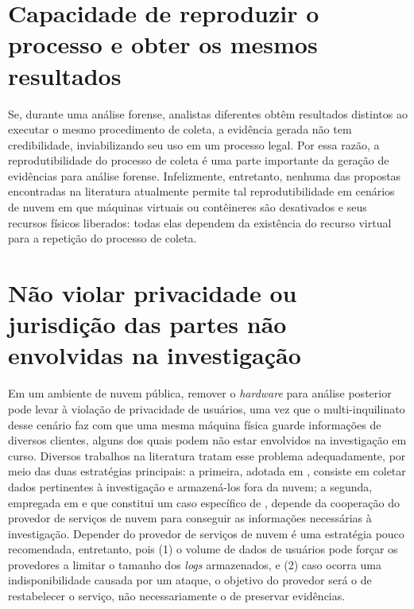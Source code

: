 \section{Capacidade de reproduzir o processo e obter os mesmos resultados}
\label{sec:reprodutibilidade}

Se, durante uma análise forense, analistas diferentes obtêm resultados distintos ao executar o mesmo procedimento de coleta, a evidência gerada não tem credibilidade, inviabilizando seu uso em um processo legal. 
%
Por essa razão, a reprodutibilidade do processo de coleta é uma parte importante da geração de evidências para análise forense.
%
Infelizmente, entretanto, nenhuma das propostas encontradas na literatura atualmente permite tal reprodutibilidade em cenários de nuvem em que máquinas virtuais ou contêineres são desativados e seus recursos físicos liberados: todas elas dependem da existência do recurso virtual para a repetição do processo de coleta.

\section{Não violar privacidade ou jurisdição das partes não envolvidas na investigação}
\label{sec:legais}

Em um ambiente de nuvem pública, remover o \textit{hardware} para análise posterior pode levar à violação de privacidade de usuários, uma vez que o multi-inquilinato desse cenário faz com que uma mesma máquina física guarde informações de diversos clientes, alguns dos quais podem não estar envolvidos na investigação em curso.
%
Diversos trabalhos na literatura tratam esse problema adequadamente, por meio das duas estratégias principais: a primeira, adotada em \cite{ReichertAutoAcquisition:2015,GeorgeDF2CE:2012,PoiselVMI:2013,DykstraFROST:2013}, consiste em coletar dados pertinentes à investigação e armazená-los fora da nuvem; a segunda, empregada em \cite{SangLogApproach:2013} e que constitui um caso específico de \cite{GeorgeDF2CE:2012}, depende da cooperação do provedor de serviços de nuvem para conseguir as informações necessárias à investigação. 
%
Depender do provedor de serviços de nuvem é uma estratégia pouco recomendada, entretanto, pois (1) o volume de dados de usuários pode forçar os provedores a limitar o tamanho dos \textit{logs} armazenados, e (2) caso ocorra uma indisponibilidade causada por um ataque, o objetivo do provedor será o de restabelecer o serviço, não necessariamente o de preservar evidências\cite{ClarkeReviewOfChallenges2015}. 


